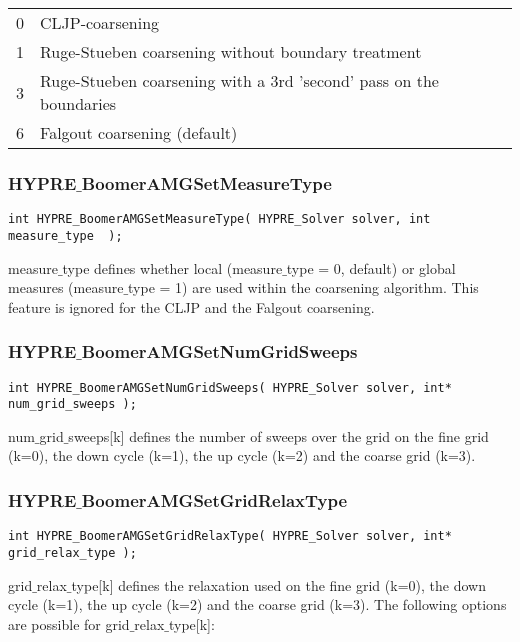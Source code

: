 \begin{tabular}{l l}
  0 & CLJP-coarsening \\
  1& 	Ruge-Stueben coarsening without boundary treatment \\
  3& 	Ruge-Stueben coarsening with a 3rd 'second' pass on the boundaries \\
 6 & 	Falgout coarsening (default) \\
\end{tabular}

\subsubsection*{HYPRE$\_$BoomerAMGSetMeasureType}
\begin{display}
\begin{verbatim}
int HYPRE_BoomerAMGSetMeasureType( HYPRE_Solver solver, int measure_type  );
\end{verbatim}
\end{display}
measure$\_$type defines 
whether local (measure$\_$type = 0, default) or global measures 
(measure$\_$type = 1) are used within the coarsening 
algorithm. This feature is ignored for the CLJP and the Falgout coarsening.

\subsubsection*{HYPRE$\_$BoomerAMGSetNumGridSweeps}
\begin{display}
\begin{verbatim}
int HYPRE_BoomerAMGSetNumGridSweeps( HYPRE_Solver solver, int* num_grid_sweeps );
\end{verbatim}
\end{display}
num$\_$grid$\_$sweeps[k] defines the number of sweeps over the grid on the fine 
grid (k=0), the down cycle (k=1), the up cycle (k=2) and the coarse grid (k=3).

\subsubsection*{HYPRE$\_$BoomerAMGSetGridRelaxType}
\begin{display}
\begin{verbatim}
int HYPRE_BoomerAMGSetGridRelaxType( HYPRE_Solver solver, int* grid_relax_type );
\end{verbatim}
\end{display}
grid$\_$relax$\_$type[k] defines the relaxation used on the fine 
grid (k=0), the down cycle (k=1), the up cycle (k=2) and the coarse grid (k=3).
The following options are possible for grid$\_$relax$\_$type[k]:

